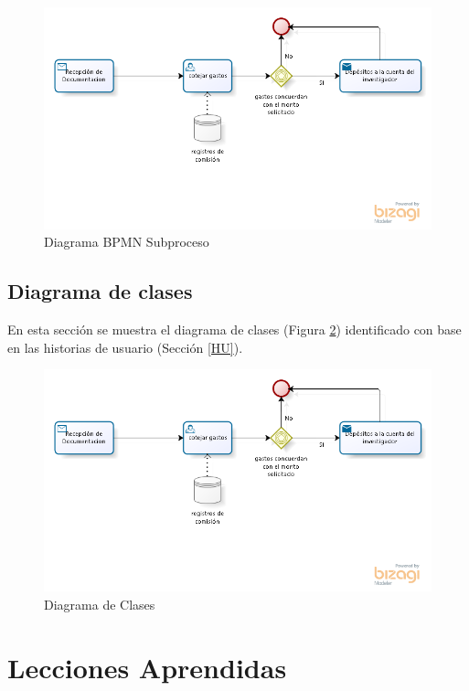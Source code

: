 \documentclass{report}
\begin{document}
    	\begin{figure}[H]
    		\centering
    		    \label{subProcesoBPMN}
    			\includegraphics[scale=0.80]{images/1models/envioGto.png}
    			\caption{Diagrama BPMN Subproceso}
    	\end{figure}
    
    \section{Diagrama de clases}
    En esta sección se muestra el diagrama de clases (Figura \ref{classDiagram}) identificado con base en las historias de usuario (Sección \ref{HU}).
      	\begin{figure}[H]
    		\centering
    		    \label{classDiagram}
    			\includegraphics[scale=0.80]{images/1models/envioGto.png}
    			\caption{Diagrama de Clases}
    	\end{figure}
       
\chapter{Lecciones Aprendidas}
    
\end{document}
